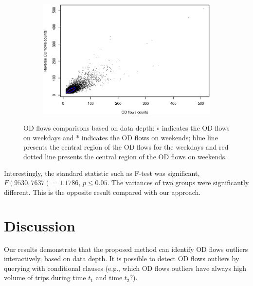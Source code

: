 \documentclass[a4paper,UKenglish]{lipics-v2016}
\begin{document}
\begin{figure}
	\centering
	\begin{subfigure}[b]{0.7\textwidth}
		\includegraphics[width=\textwidth]{images/com_weekdays_weekends.eps}
	\end{subfigure}
	\caption{OD flows comparisons based on data depth: $\circ$ indicates the OD flows on weekdays and * indicates the OD flows on weekends; blue line presents the central region of the OD flows for the weekdays and red dotted line presents the central region of the OD flows on weekends. }\label{fig:OD_comparisons}	
\end{figure}

Interestingly, the standard statistic such as  F-test was significant, $F(9530,7637) =1.1786$, $p \leq 0.05$. The variances of two groups were significantly different. This is the opposite result compared with our approach. 


%

\section{Discussion}
\label{sec:discussion}
Our results demonstrate that the proposed method can identify OD flows outliers interactively, based on data depth. It is possible to detect OD flows outliers by querying with conditional clauses (e.g., which OD flows outliers have always high volume of trips during time $t_1$ and time $t_2$?). 
\end{document}
